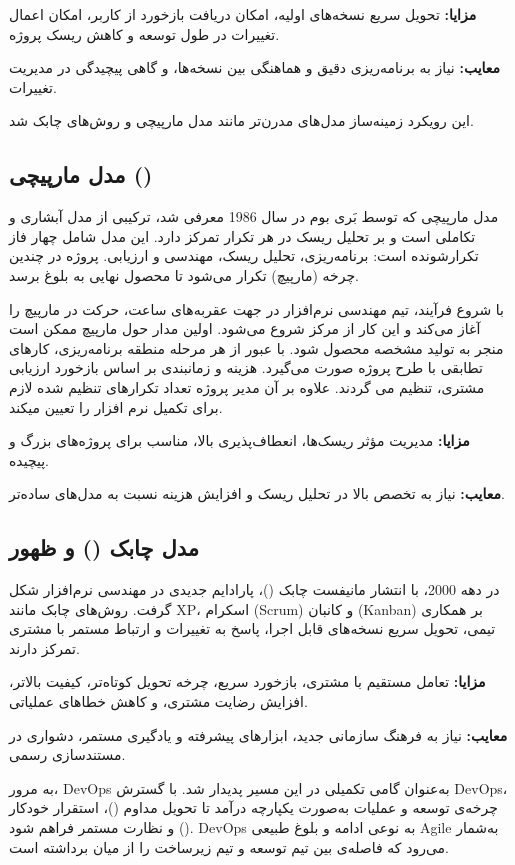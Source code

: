 \noindent \textbf{مزایا:} تحویل سریع نسخه‌های اولیه، امکان دریافت بازخورد از کاربر، امکان اعمال تغییرات در طول توسعه و کاهش ریسک پروژه.\cite{Software-development-history}

\noindent \textbf{معایب:} نیاز به برنامه‌ریزی دقیق و هماهنگی بین نسخه‌ها، و گاهی پیچیدگی در مدیریت تغییرات.\cite{Software-development-history}

این رویکرد زمینه‌ساز مدل‌های مدرن‌تر مانند مدل مارپیچی و روش‌های چابک شد.

\subsection{مدل مارپیچی ()}
مدل مارپیچی که توسط بَری بوم در سال 1986 معرفی شد، ترکیبی از مدل آبشاری و تکاملی است و بر تحلیل ریسک در هر تکرار تمرکز دارد. این مدل شامل چهار فاز تکرارشونده است: برنامه‌ریزی، تحلیل ریسک، مهندسی و ارزیابی. پروژه در چندین چرخه (مارپیچ) تکرار می‌شود تا محصول نهایی به بلوغ برسد.\cite{Software-development-history}

با شروع فرآیند، تیم مهندسی نرم‌افزار در جهت عقربه‌های ساعت، حرکت در مارپیچ را آغاز می‌کند و این کار از مرکز شروع می‌شود. اولین مدار حول مارپیچ ممکن است منجر به تولید مشخصه محصول شود. با عبور از هر مرحله منطقه برنامه‌ریزی، کارهای تطابقی با طرح پروژه صورت می‌گیرد. هزینه و زمانبندی بر اساس بازخورد ارزیابی مشتری، تنظیم می گردند. علاوه بر آن مدیر پروژه تعداد تکرارهای تنظیم شده لازم برای تکمیل نرم افزار را تعیین میکند.\cite{Software-development-history}

\noindent \textbf{مزایا:} مدیریت مؤثر ریسک‌ها، انعطاف‌پذیری بالا، مناسب برای پروژه‌های بزرگ و پیچیده.\cite{Software-development-history}

\noindent \textbf{معایب:} نیاز به تخصص بالا در تحلیل ریسک و افزایش هزینه نسبت به مدل‌های ساده‌تر.\cite{Software-development-history}

\subsection{مدل چابک () و ظهور }
در دهه 2000، با انتشار مانیفست چابک ()، پارادایم جدیدی در مهندسی نرم‌افزار شکل گرفت. روش‌های چابک مانند XP، اسکرام (Scrum) و کانبان (Kanban) بر همکاری تیمی، تحویل سریع نسخه‌های قابل اجرا، پاسخ به تغییرات و ارتباط مستمر با مشتری تمرکز دارند.\cite{Software-development-history}

\noindent \textbf{مزایا:} تعامل مستقیم با مشتری، بازخورد سریع، چرخه تحویل کوتاه‌تر، کیفیت بالاتر، افزایش رضایت مشتری، و کاهش خطاهای عملیاتی.\cite{Software-development-history}

\noindent \textbf{معایب:} نیاز به فرهنگ سازمانی جدید، ابزارهای پیشرفته و یادگیری مستمر، دشواری در مستندسازی رسمی.\cite{Software-development-history}

به مرور، DevOps به‌عنوان گامی تکمیلی در این مسیر پدیدار شد. با گسترش DevOps، چرخه‌ی توسعه و عملیات به‌صورت یکپارچه درآمد تا تحویل مداوم ()، استقرار خودکار () و نظارت مستمر فراهم شود. DevOps به نوعی ادامه و بلوغ طبیعی Agile به‌شمار می‌رود که فاصله‌ی بین تیم توسعه و تیم زیرساخت را از میان برداشته است. \cite{Software-development-history}